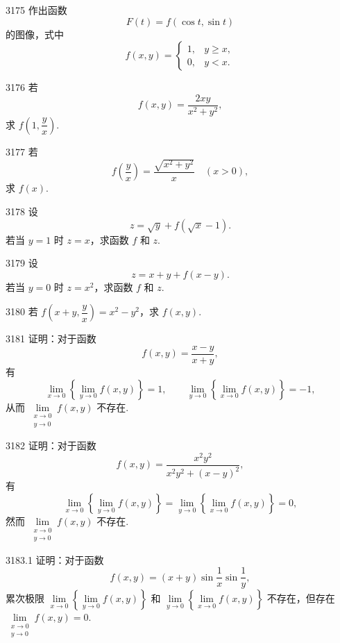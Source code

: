 \begin{prob}[M]{3175}
作出函数
\[
F(t) = f(\cos t, \sin t)
\]
的图像，式中
\[
f(x, y) = \begin{cases}
1, & y \geqslant x, \\
0, & y < x.
\end{cases}
\]
\end{prob}

\begin{prob}[S]{3176}
若
\[
f(x, y) = \frac{2xy}{x^2 + y^2},
\]
求 $f\left(1, \dfrac{y}{x}\right)$.
\end{prob}

\begin{prob}[S]{3177}
若
\[
f\left(\frac{y}{x}\right) = \frac{\sqrt{x^2 + y^2}}{x} \quad (x > 0),
\]
求 $f(x)$.
\end{prob}

\begin{prob}[S]{3178}
设
\[
z = \sqrt{y} + f(\sqrt{x} - 1).
\]
若当 $y = 1$ 时 $z = x$，求函数 $f$ 和 $z$.
\end{prob}

\begin{prob}[S]{3179}
设
\[
z = x + y + f(x - y).
\]
若当 $y = 0$ 时 $z = x^2$，求函数 $f$ 和 $z$.
\end{prob}

\begin{prob}[S]{3180}
若 $f\left(x + y, \dfrac{y}{x}\right) = x^2 - y^2$，求 $f(x, y)$.
\end{prob}

\begin{prob}[M]{3181}
证明：对于函数
\[
f(x, y) = \frac{x - y}{x + y},
\]
有
\[
\lim_{x \to 0} \left\{ \lim_{y \to 0} f(x, y) \right\} = 1, \qquad \lim_{y \to 0} \left\{ \lim_{x \to 0} f(x, y) \right\} = -1,
\]
从而 $\lim\limits_{\substack{x \to 0 \\ y \to 0}} f(x, y)$ 不存在.
\end{prob}

\begin{prob}[M]{3182}
证明：对于函数
\[
f(x, y) = \frac{x^2 y^2}{x^2 y^2 + (x - y)^2},
\]
有
\[
\lim_{x \to 0} \left\{ \lim_{y \to 0} f(x, y) \right\} = \lim_{y \to 0} \left\{ \lim_{x \to 0} f(x, y) \right\} = 0,
\]
然而 $\lim\limits_{\substack{x \to 0 \\ y \to 0}} f(x, y)$ 不存在.
\end{prob}

\begin{prob}[M]{3183.1}
证明：对于函数
\[
f(x, y) = (x + y)\sin\frac{1}{x}\sin\frac{1}{y},
\]
累次极限 $\lim\limits_{x \to 0} \left\{ \lim\limits_{y \to 0} f(x, y) \right\}$ 和 $\lim\limits_{y \to 0} \left\{ \lim\limits_{x \to 0} f(x, y) \right\}$ 不存在，但存在 $\lim\limits_{\substack{x \to 0 \\ y \to 0}} f(x, y) = 0$.
\end{prob}

